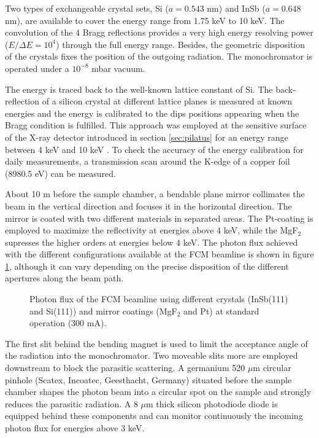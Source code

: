 Two types of exchangeable crystal sets, Si ($a=0.543$ nm) and InSb ($a=0.648$ nm), are available to cover the energy range from 1.75 keV to 10 keV. The convolution of the 4 Bragg reflections provides a very high energy resolving power ($E/\Delta E = 10^4 $) through the full energy range. Besides, the geometric disposition of the crystals fixes the position of the outgoing radiation. The monochromator is operated under a $10^{-8}$ mbar vacuum.

The energy is traced back to the well-known lattice constant of Si. The back-reflection of a silicon crystal at different lattice planes is measured at known energies and the energy is calibrated to the dips positions appearing when the Bragg condition is fulfilled. This approach was employed at the sensitive surface of the X-ray detector introduced in section \ref{sec:pilatus} for an energy range between 4 keV and 10 keV \citep{gollwitzer_diffraction_2014}. To check the accuracy of the energy calibration for daily measurements, a transmission scan around the K-edge of a copper foil (8980.5 eV) can be measured.

About 10 m before the sample chamber, a bendable plane mirror collimates the beam in the vertical direction and focuses it in the horizontal direction. The mirror is coated with two different materials in separated areas. The Pt-coating is employed to maximize the reflectivity at energies above 4 keV, while the MgF$_2$ supresses the higher orders at energies below 4 keV. The photon flux achieved with the different configurations available at the FCM beamline is shown in figure \ref{fig:FCMBeamlineFlux}, although it can vary depending on the precise disposition of the different apertures along the beam path.

\begin{figure}%
	\centering
		
		\caption{Photon flux of the FCM beamline using different crystals (InSb(111) and Si(111)) and mirror coatings (MgF$_2$ and Pt) at standard operation (300 mA).}
		\label{fig:FCMBeamlineFlux}
\end{figure}

The first slit behind the bending magnet is used to limit the acceptance angle of the radiation into the monochromator. Two moveable slits more are employed downstream to block the parasitic scattering. A germanium 520 $\mu$m circular pinhole (Scatex, Incoatec, Geesthacht, Germany) situated before the sample chamber shapes the photon beam into a circular spot on the sample and strongly reduces the parasitic radiation. A 8 $\mu$m thick silicon photodiode diode is equipped behind these components and can monitor continuously the incoming photon flux for energies above 3 keV.

